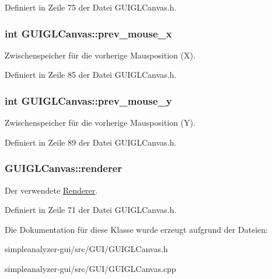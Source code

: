 Definiert in Zeile 75 der Datei G\-U\-I\-G\-L\-Canvas.\-h.

\hypertarget{classGUIGLCanvas_afc22c47a62b8d5b165a22d059816ee22}{
\subsubsection[{prev\-\_\-mouse\-\_\-x}]{\setlength{\rightskip}{0pt plus 5cm}int G\-U\-I\-G\-L\-Canvas\-::prev\-\_\-mouse\-\_\-x\hspace{0.3cm}{\ttfamily [private]}}}\label{classGUIGLCanvas_afc22c47a62b8d5b165a22d059816ee22}
Zwischenspeicher für die vorherige Mausposition (X). 

Definiert in Zeile 85 der Datei G\-U\-I\-G\-L\-Canvas.\-h.

\hypertarget{classGUIGLCanvas_a684c82bd591f01b5f600c9589158e0e0}{
\subsubsection[{prev\-\_\-mouse\-\_\-y}]{\setlength{\rightskip}{0pt plus 5cm}int G\-U\-I\-G\-L\-Canvas\-::prev\-\_\-mouse\-\_\-y\hspace{0.3cm}{\ttfamily [private]}}}\label{classGUIGLCanvas_a684c82bd591f01b5f600c9589158e0e0}
Zwischenspeicher für die vorherige Mausposition (Y). 

Definiert in Zeile 89 der Datei G\-U\-I\-G\-L\-Canvas.\-h.

\hypertarget{classGUIGLCanvas_a33a4ad3bc364d697396c55d011bfac44}{
\subsubsection[{renderer}]{ G\-U\-I\-G\-L\-Canvas\-::renderer\hspace{0.3cm}{\ttfamily [private]}}}\label{classGUIGLCanvas_a33a4ad3bc364d697396c55d011bfac44}
Der verwendete \hyperlink{classRenderer}{Renderer}. 

Definiert in Zeile 71 der Datei G\-U\-I\-G\-L\-Canvas.\-h.



Die Dokumentation für diese Klasse wurde erzeugt aufgrund der Dateien\-:\begin{DoxyCompactItemize}
\item 
simpleanalyzer-\/gui/src/\-G\-U\-I/G\-U\-I\-G\-L\-Canvas.\-h\item 
simpleanalyzer-\/gui/src/\-G\-U\-I/G\-U\-I\-G\-L\-Canvas.\-cpp\end{DoxyCompactItemize}
